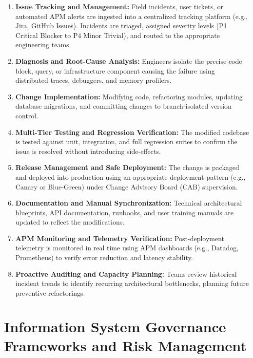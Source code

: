 \documentclass[11pt,a4paper]{article}
\begin{document}
\begin{enumerate}
    \item \textbf{Issue Tracking and Management:} Field incidents, user tickets, or automated APM alerts are ingested into a centralized tracking platform (e.g., Jira, GitHub Issues). Incidents are triaged, assigned severity levels (P1 Critical Blocker to P4 Minor Trivial), and routed to the appropriate engineering teams.
    \item \textbf{Diagnosis and Root-Cause Analysis:} Engineers isolate the precise code block, query, or infrastructure component causing the failure using distributed traces, debuggers, and memory profilers.
    \item \textbf{Change Implementation:} Modifying code, refactoring modules, updating database migrations, and committing changes to branch-isolated version control.
    \item \textbf{Multi-Tier Testing and Regression Verification:} The modified codebase is tested against unit, integration, and full regression suites to confirm the issue is resolved without introducing side-effects.
    \item \textbf{Release Management and Safe Deployment:} The change is packaged and deployed into production using an appropriate deployment pattern (e.g., Canary or Blue-Green) under Change Advisory Board (CAB) supervision.
    \item \textbf{Documentation and Manual Synchronization:} Technical architectural blueprints, API documentation, runbooks, and user training manuals are updated to reflect the modifications.
    \item \textbf{APM Monitoring and Telemetry Verification:} Post-deployment telemetry is monitored in real time using APM dashboards (e.g., Datadog, Prometheus) to verify error reduction and latency stability.
    \item \textbf{Proactive Auditing and Capacity Planning:} Teams review historical incident trends to identify recurring architectural bottlenecks, planning future preventive refactorings.
\end{enumerate}

\section[Governance and Risk Management]{Information System Governance Frameworks and Risk Management}
\label{sec:governance}
\end{document}
